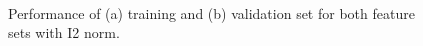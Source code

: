\documentclass[11pt]{article}
\begin{document}
\begin{figure}[!h]
  \centering 
	\\%
  \caption{Performance of (a) training and (b) validation set for both feature sets with I2 norm.}
  \label{fig:I2_bogram}
\end{figure}

%
%
\end{document}
